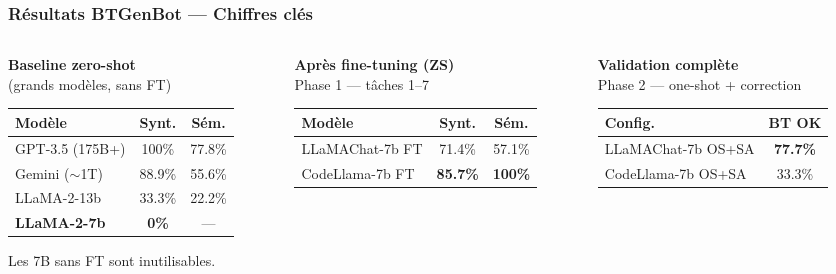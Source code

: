 \documentclass[aspectratio=169]{beamer}
\begin{document}
\begin{frame}
  \frametitle{Résultats BTGenBot — Chiffres clés}

  \begin{columns}[T]
    \begin{column}{0.36\textwidth}
      \textbf{\small Baseline zero-shot}\\
      {\tiny (grands modèles, sans FT)}
      \vspace{0.3em}

      {\scriptsize
      \begin{tabular}{p{2.4cm}cc}
        \toprule
        Modèle & Synt. & Sém. \\
        \midrule
        GPT-3.5 (175B+) & 100\% & 77.8\% \\
        Gemini ($\sim$1T) & 88.9\% & 55.6\% \\
        LLaMA-2-13b & 33.3\% & 22.2\% \\
        \midrule
        \textbf{LLaMA-2-7b} & \textbf{0\%} & — \\
        \bottomrule
      \end{tabular}}

      \vspace{0.3em}
      {\tiny Les 7B sans FT sont inutilisables.}
    \end{column}

    \begin{column}{0.30\textwidth}
      \textbf{\small Après fine-tuning (ZS)}\\
      {\tiny Phase 1 — tâches 1–7}
      \vspace{0.3em}

      {\scriptsize
      \begin{tabular}{lcc}
        \toprule
        Modèle & Synt. & Sém. \\
        \midrule
        LLaMAChat-7b FT & 71.4\% & 57.1\% \\
        CodeLlama-7b FT & \textbf{85.7\%} & \textbf{100\%} \\
        \bottomrule
      \end{tabular}}
    \end{column}

    \begin{column}{0.30\textwidth}
      \textbf{\small Validation complète}\\
      {\tiny Phase 2 — one-shot + correction}
      \vspace{0.3em}

      {\scriptsize
      \begin{tabular}{lc}
        \toprule
        Config. & BT OK \\
        \midrule
        LLaMAChat-7b OS+SA & \textbf{77.7\%} \\
        CodeLlama-7b OS+SA & 33.3\% \\
        \bottomrule
      \end{tabular}}


\end{column}
\end{columns}
\end{frame}
\end{document}
